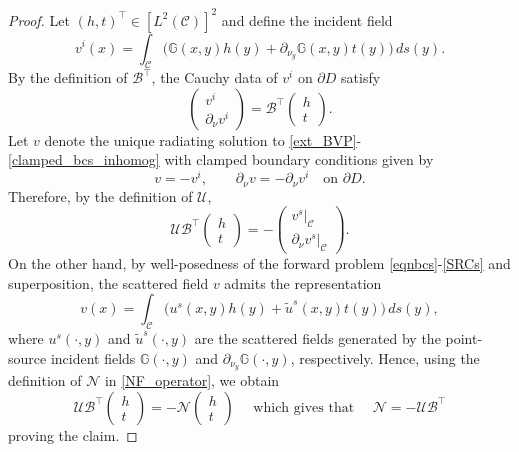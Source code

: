 \documentclass[10pt,a4paper]{amsart}
\begin{document}
\begin{proof}
Let $(h,t)^\top\in [L^2(\mathcal C)]^2$ and define the incident field
\[
v^i(x)=
\int_{\mathcal C}
\big(
\mathbb G(x,y)h(y)
+\partial_{\nu_y}\mathbb G(x,y)t(y)
\big)\,ds(y).
\]
By the definition of $\mathcal B^\top$, the Cauchy data of $v^i$ on
$\partial D$ satisfy
\[
\begin{pmatrix}
v^i\\
\partial_\nu v^i
\end{pmatrix}
=
\mathcal B^\top
\begin{pmatrix}
h\\
t
\end{pmatrix}.
\]
Let $v$ denote the unique radiating solution to \eqref{ext_BVP}-\eqref{clamped_bcs_inhomog} with clamped boundary conditions given by 
\[
v=-v^i,\qquad
\partial_\nu v=-\partial_\nu v^i
\quad\text{on }\partial D .
\]
Therefore, by the definition of $\mathcal U$,
\[
\mathcal U\mathcal B^\top
\begin{pmatrix}
h\\
t
\end{pmatrix}
=
-
\begin{pmatrix}
v^s|_{\mathcal C}\\
\partial_\nu v^s|_{\mathcal C}
\end{pmatrix}.
\]
On the other hand, {by well-posedness of the forward problem \eqref{eqnbcs}-\eqref{SRCs} and superposition}, the scattered field $v$ admits the representation
\[
v(x)
=
\int_{\mathcal C}
\big(
u^s(x,y)h(y)+\tilde u^s(x,y)t(y)
\big)\,ds(y),
\]
where $u^s(\cdot,y)$ and $\tilde u^s(\cdot,y)$ are the scattered fields
generated by the point-source incident fields
$\mathbb G(\cdot,y)$ and $\partial_{\nu_y}\mathbb G(\cdot,y)$,
respectively. Hence, using the definition of $\mathcal N$ in
\eqref{NF_operator}, we obtain
\[
\mathcal U\mathcal B^\top
\begin{pmatrix}
h\\
t
\end{pmatrix}
=
-\mathcal N
\begin{pmatrix}
h\\
t
\end{pmatrix}
\quad \text{ which gives that } \quad \mathcal N=-\mathcal U\mathcal B^\top 
\]
proving the claim. 
\end{proof}
\end{document}
